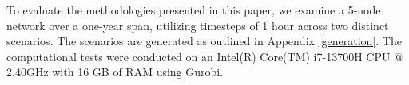 \documentclass[smallextended,natbib]{svjour3}       %
\numberwithin{theorem}{section}
\begin{document}


To evaluate the methodologies presented in this paper, we examine a  5-node network over a one-year span, utilizing timesteps of 1 hour across two distinct scenarios.
The scenarios are generated as outlined in Appendix  \ref{generation}. 
The computational tests were conducted on an Intel(R) Core(TM) i7-13700H CPU @ 2.40GHz with 16 GB of RAM using Gurobi.






  

\end{document}
